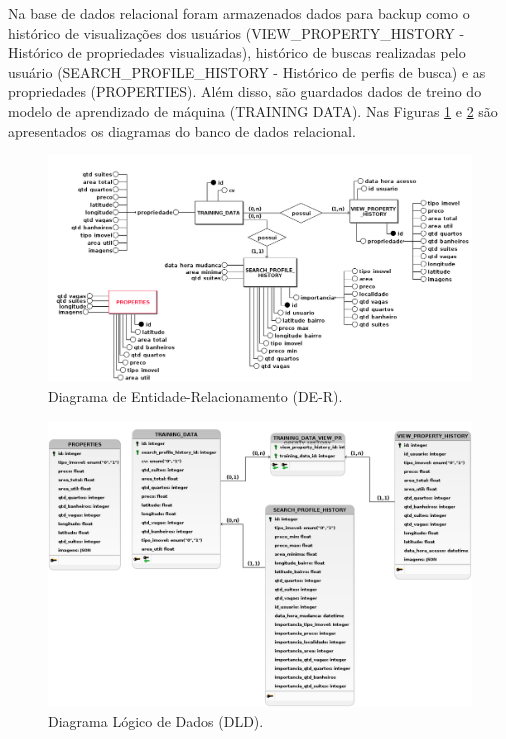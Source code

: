 Na base de dados relacional foram armazenados dados para backup como o histórico de visualizações dos usuários (VIEW\_PROPERTY\_HISTORY - Histórico de propriedades visualizadas), histórico de buscas realizadas pelo usuário (SEARCH\_PROFILE\_HISTORY - Histórico de perfis de busca) e as propriedades (PROPERTIES). Além disso, são guardados dados de treino do modelo de aprendizado de máquina (TRAINING DATA).  Nas Figuras \ref{fig:der} e \ref{fig:diagrama_esquema} são apresentados os diagramas do banco de dados relacional.

\begin{figure}[H]
    \centering
    \includegraphics[scale=0.40]{figuras/proposta/der.png}
    \caption[Diagrama de Entidade-Relacionamento (DE-R)]{Diagrama de Entidade-Relacionamento (DE-R).}
    \label{fig:der}
\end{figure}

\begin{figure}[H]
    \centering
    \includegraphics[scale=0.40]{figuras/proposta/diagrama_esquema.png}
    \caption[Diagrama Lógico de Dados]{Diagrama Lógico de Dados (DLD).}
    \label{fig:diagrama_esquema}
\end{figure}

